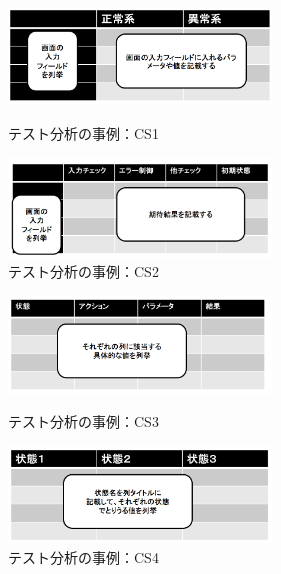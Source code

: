 \documentclass[10pt,a4j]{jarticle}
\begin{document}
\begin{figure}[htbp]
 \begin{minipage}{0.5\hsize}
  \begin{center}
   \includegraphics[width=70mm]{./image/D-3-Fig1-1.png}
  \end{center}
  \caption{テスト分析の事例：CS1}
  \label{fig:D-3-Fig1-1}
 \end{minipage}
 \begin{minipage}{0.5\hsize}
  \begin{center}
   \includegraphics[width=70mm]{./image/D-3-Fig1-2.png}
  \end{center}
  \caption{テスト分析の事例：CS2}
  \label{fig:D-3-Fig1-2}
 \end{minipage}
\end{figure}
\begin{figure}[htbp]
 \begin{minipage}{0.5\hsize}
  \begin{center}
   \includegraphics[width=70mm]{./image/D-3-Fig1-3.png}
  \end{center}
  \caption{テスト分析の事例：CS3}
  \label{fig:D-3-Fig1-3}
 \end{minipage}
 \begin{minipage}{0.5\hsize}
  \begin{center}
   \includegraphics[width=70mm]{./image/D-3-Fig1-4.png}
  \end{center}
  \caption{テスト分析の事例：CS4}
  \label{fig:D-3-Fig1-4}
 \end{minipage}
\end{figure}
\end{document}
